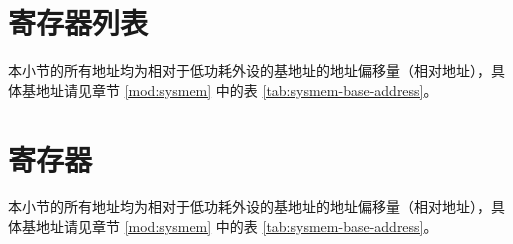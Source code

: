 \documentclass[main\_\_CN.tex]{subfiles}
\begin{document}





\section{寄存器列表}
\label{sec:lpperi-reg-summ}

本小节的所有地址均为相对于低功耗外设的基地址的地址偏移量（相对地址），具体基地址请见章节 \ref{mod:sysmem} \textit{} 中的表 \ref{tab:sysmem-base-address}。



\section{寄存器}

本小节的所有地址均为相对于低功耗外设的基地址的地址偏移量（相对地址），具体基地址请见章节 \ref{mod:sysmem} \textit{} 中的表 \ref{tab:sysmem-base-address}。




\end{document}
